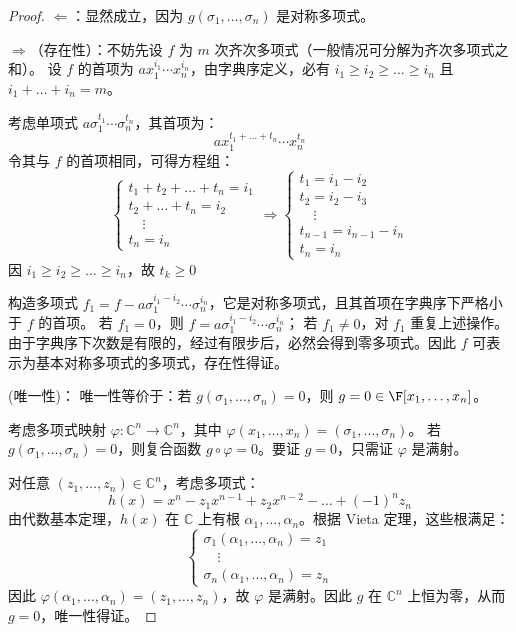 \begin{proof}
	\( \Leftarrow \)：显然成立，因为 \( g(\sigma_1,\dots,\sigma_n) \) 是对称多项式。
	
	\( \Rightarrow \)（存在性）：不妨先设 \( f \) 为 \( m \) 次齐次多项式（一般情况可分解为齐次多项式之和）。
	设 \( f \) 的首项为 \( a x_1^{i_1} \cdots x_n^{i_n} \)，由字典序定义，必有 \( i_1 \ge i_2 \ge \dots \ge i_n \) 且 \( i_1+\dots+i_n=m \)。
	
	考虑单项式 \( a \sigma_1^{t_1} \cdots \sigma_n^{t_n} \)，其首项为：
	\[
	a x_1^{t_1+\dots+t_n} \cdots x_n^{t_n}
	\]
	令其与 \( f \) 的首项相同，可得方程组：
	\[
	\begin{cases}
		t_1+t_2+\dots+t_n = i_1 \\
		t_2+\dots+t_n = i_2 \\
		\quad \vdots \\
		t_n = i_n
	\end{cases}
	\Rightarrow
	\begin{cases}
		t_1 = i_1 - i_2 \\
		t_2 = i_2 - i_3 \\
		\quad \vdots \\
		t_{n-1} = i_{n-1} - i_n \\
		t_n = i_n
	\end{cases}
	\]
	因 \( i_1 \ge i_2 \ge \dots \ge i_n \)，故 \( t_k \ge 0 \)
	
	构造多项式 \( f_1 = f - a \sigma_1^{i_1-i_2} \cdots \sigma_n^{i_n} \)，它是对称多项式，且其首项在字典序下严格小于 \( f \) 的首项。
	若 \( f_1=0 \)，则 \( f = a \sigma_1^{i_1-i_2} \cdots \sigma_n^{i_n} \)；
	若 \( f_1 \neq 0 \)，对 \( f_1 \) 重复上述操作。由于字典序下次数是有限的，经过有限步后，必然会得到零多项式。因此 \( f \) 可表示为基本对称多项式的多项式，存在性得证。


	(唯一性)：
	唯一性等价于：若 \( g(\sigma_1,\dots,\sigma_n)=0 \)，则 \( g=0 \in \F[x_1,\dots,x_n] \)。
	
	考虑多项式映射 \( \varphi: \mathbb{C}^n \to \mathbb{C}^n \)，其中 \( \varphi(x_1,\dots,x_n) = (\sigma_1,\dots,\sigma_n) \)。
	若 \( g(\sigma_1,\dots,\sigma_n)=0 \)，则复合函数 \( g \circ \varphi = 0 \)。要证 \( g=0 \)，只需证 \( \varphi \) 是满射。
	
	对任意 \( (z_1,\dots,z_n) \in \mathbb{C}^n \)，考虑多项式：
	\[
	h(x) = x^n - z_1 x^{n-1} + z_2 x^{n-2} - \dots + (-1)^n z_n
	\]
	由代数基本定理，\( h(x) \) 在 \( \mathbb{C} \) 上有根 \( \alpha_1,\dots,\alpha_n \)。根据 Vieta 定理，这些根满足：
	\[
	\begin{cases}
		\sigma_1(\alpha_1,\dots,\alpha_n) = z_1 \\
		\quad \vdots \\
		\sigma_n(\alpha_1,\dots,\alpha_n) = z_n
	\end{cases}
	\]
	因此 \( \varphi(\alpha_1,\dots,\alpha_n) = (z_1,\dots,z_n) \)，故 \( \varphi \) 是满射。因此 \( g \) 在 \( \mathbb{C}^n \) 上恒为零，从而 \( g=0 \)，唯一性得证。
	
\end{proof}
